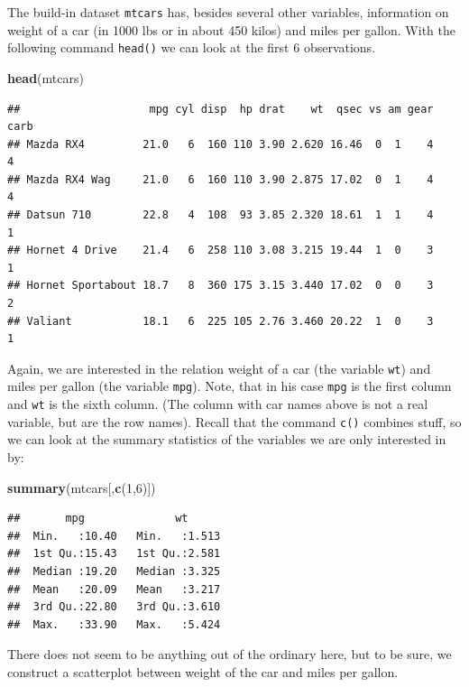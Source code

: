 \documentclass[]{article}
\newenvironment{Shaded}{\begin{snugshade}}{\end{snugshade}}
\newcommand{\KeywordTok}[1]{\textcolor[rgb]{0.13,0.29,0.53}{\textbf{{#1}}}}
\newcommand{\DecValTok}[1]{\textcolor[rgb]{0.00,0.00,0.81}{{#1}}}
\newcommand{\NormalTok}[1]{{#1}}
\theoremstyle{definition}
\theoremstyle{definition}
\theoremstyle{definition}
\theoremstyle{remark}
\begin{document}
The build-in dataset \texttt{mtcars} has, besides several other
variables, information on weight of a car (in 1000 lbs or in about 450
kilos) and miles per gallon. With the following command \texttt{head()}
we can look at the first 6 observations.

\begin{Shaded}
\begin{Highlighting}[]
\KeywordTok{head}\NormalTok{(mtcars)}
\end{Highlighting}
\end{Shaded}

\begin{verbatim}
##                    mpg cyl disp  hp drat    wt  qsec vs am gear carb
## Mazda RX4         21.0   6  160 110 3.90 2.620 16.46  0  1    4    4
## Mazda RX4 Wag     21.0   6  160 110 3.90 2.875 17.02  0  1    4    4
## Datsun 710        22.8   4  108  93 3.85 2.320 18.61  1  1    4    1
## Hornet 4 Drive    21.4   6  258 110 3.08 3.215 19.44  1  0    3    1
## Hornet Sportabout 18.7   8  360 175 3.15 3.440 17.02  0  0    3    2
## Valiant           18.1   6  225 105 2.76 3.460 20.22  1  0    3    1
\end{verbatim}

Again, we are interested in the relation weight of a car (the variable
\texttt{wt}) and miles per gallon (the variable \texttt{mpg}). Note,
that in his case \texttt{mpg} is the first column and \texttt{wt} is the
sixth column. (The column with car names above is not a real variable,
but are the row names). Recall that the command \texttt{c()} combines
stuff, so we can look at the summary statistics of the variables we are
only interested in by:

\begin{Shaded}
\begin{Highlighting}[]
\KeywordTok{summary}\NormalTok{(mtcars[,}\KeywordTok{c}\NormalTok{(}\DecValTok{1}\NormalTok{,}\DecValTok{6}\NormalTok{)])}
\end{Highlighting}
\end{Shaded}

\begin{verbatim}
##       mpg              wt       
##  Min.   :10.40   Min.   :1.513  
##  1st Qu.:15.43   1st Qu.:2.581  
##  Median :19.20   Median :3.325  
##  Mean   :20.09   Mean   :3.217  
##  3rd Qu.:22.80   3rd Qu.:3.610  
##  Max.   :33.90   Max.   :5.424
\end{verbatim}

There does not seem to be anything out of the ordinary here, but to be
sure, we construct a scatterplot between weight of the car and miles per
gallon.
\end{document}

